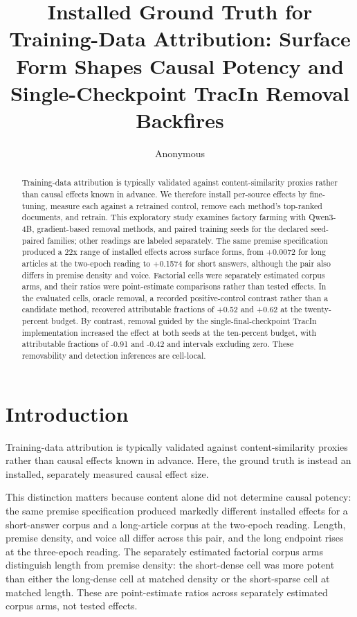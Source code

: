 \documentclass[10pt]{article}
\title{ Installed Ground Truth for Training-Data Attribution: Surface Form Shapes Causal Potency and Single-Checkpoint TracIn Removal Backfires }
\author{ Anonymous }
\date{}
\begin{document}
\maketitle




\begin{abstract}
Training-data attribution is typically validated against content-similarity proxies rather than causal effects known in advance. We therefore install per-source effects by fine-tuning, measure each against a retrained control, remove each method’s top-ranked documents, and retrain. This exploratory study examines factory farming with Qwen3-4B, gradient-based removal methods, and paired training seeds for the declared seed-paired families; other readings are labeled separately. The same premise specification produced a 22x range of installed effects across surface forms, from +0.0072 for long articles at the two-epoch reading to +0.1574 for short answers, although the pair also differs in premise density and voice. Factorial cells were separately estimated corpus arms, and their ratios were point-estimate comparisons rather than tested effects. In the evaluated cells, oracle removal, a recorded positive-control contrast rather than a candidate method, recovered attributable fractions of +0.52 and +0.62 at the twenty-percent budget. By contrast, removal guided by the single-final-checkpoint TracIn implementation increased the effect at both seeds at the ten-percent budget, with attributable fractions of -0.91 and -0.42 and intervals excluding zero. These removability and detection inferences are cell-local.


\end{abstract}




\section{ Introduction }
\label{sec:introduction}

Training-data attribution is typically validated against content-similarity proxies rather than causal effects known in advance. Here, the ground truth is instead an installed, separately measured causal effect size.



This distinction matters because content alone did not determine causal potency: the same premise specification produced markedly different installed effects for a short-answer corpus and a long-article corpus at the two-epoch reading. Length, premise density, and voice all differ across this pair, and the long endpoint rises at the three-epoch reading. The separately estimated factorial corpus arms distinguish length from premise density: the short-dense cell was more potent than either the long-dense cell at matched density or the short-sparse cell at matched length. These are point-estimate ratios across separately estimated corpus arms, not tested effects.
\end{document}
